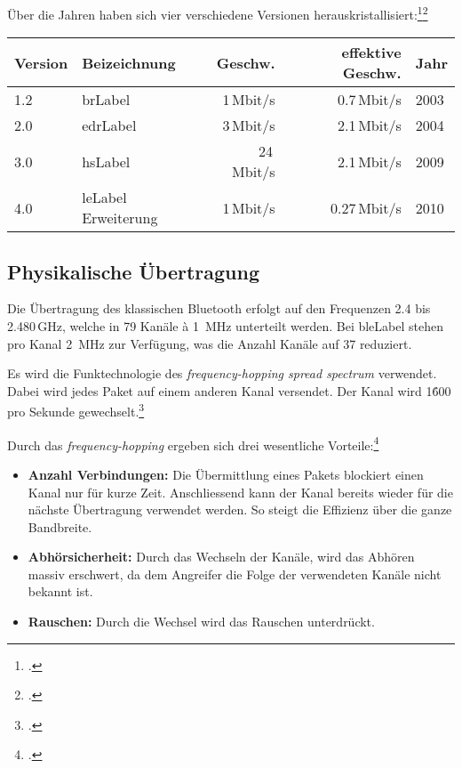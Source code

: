 Über die Jahren haben sich vier verschiedene Versionen herauskristallisiert:\footcite{Bluetooth_low_energy_Wikipedia_2015-04-17}\footcite{Our_History_Bluetooth_Technology_Website_2015-04-17}
\begin{table}[H]
\small\sffamily\renewcommand{\arraystretch}{1.4}
\begin{tabular}{llrrl}
\toprule
	Version & Beizeichnung & Geschw. & effektive Geschw.  & Jahr\\
\midrule
	1.2 & \gls{brLabel} & 1\,Mbit/s & 0.7\,Mbit/s & 2003 \\
	2.0 & \gls{edrLabel} & 3\,Mbit/s & 2.1\,Mbit/s & 2004 \\
	3.0 & \gls{hsLabel} & 24\,Mbit/s & 2.1\,Mbit/s & 2009\\
	4.0 & \gls{leLabel} Erweiterung & 1\,Mbit/s &  0.27\,Mbit/s & 2010 \\
\bottomrule
\end{tabular}
\end{table}



\subsection{Physikalische Übertragung}
Die Übertragung des klassischen Bluetooth erfolgt auf den Frequenzen 2.4 bis 2.480\,GHz, welche in 79 Kanäle à 1\, MHz unterteilt werden.
Bei \gls{bleLabel} stehen pro Kanal 2\, MHz zur Verfügung, was die Anzahl Kanäle auf 37 reduziert.

Es wird die Funktechnologie des \textit{frequency-hopping spread spectrum} verwendet.
Dabei wird jedes Paket auf einem anderen Kanal versendet.
Der Kanal wird 1\'600 pro Sekunde gewechselt.\footcite{Bluetooth_Wikipedia_2015-04-17}

Durch das \textit{frequency-hopping} ergeben sich drei wesentliche Vorteile:\footcite{Frequency-hopping_spread_spectrum_-_Wikipedia_2015-04-17}
\begin{itemize}
	\item \textbf{Anzahl Verbindungen:} Die Übermittlung eines Pakets blockiert einen Kanal nur für kurze Zeit.
		Anschliessend kann der Kanal bereits wieder für die nächste Übertragung verwendet werden.
		So steigt die Effizienz über die ganze Bandbreite.
	\item \textbf{Abhörsicherheit:} Durch das Wechseln der Kanäle, wird das Abhören massiv erschwert, da dem Angreifer die Folge der verwendeten Kanäle nicht bekannt ist.
	\item \textbf{Rauschen:} Durch die Wechsel wird das Rauschen unterdrückt.
\end{itemize}

